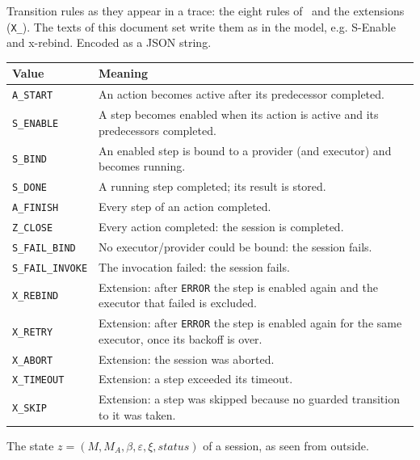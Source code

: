 \documentclass[a4paper]{arrowhead}
\begin{document}
Transition rules as they appear in a trace: the eight rules of~\cite{varga2026} and the extensions (\texttt{X\_}). The texts of this document set write them as in the model, e.g. S-Enable and x-rebind.
 Encoded as a JSON string.
{\small
\begin{longtable}{|p{3.9cm}|p{11.9cm}|}

\hline
\rowcolor{gray!33} Value & Meaning \\ \hline
\endhead
\texttt{A\_START} & An action becomes active after its predecessor completed. \\ \hline
\texttt{S\_ENABLE} & A step becomes enabled when its action is active and its predecessors completed. \\ \hline
\texttt{S\_BIND} & An enabled step is bound to a provider (and executor) and becomes running. \\ \hline
\texttt{S\_DONE} & A running step completed; its result is stored. \\ \hline
\texttt{A\_FINISH} & Every step of an action completed. \\ \hline
\texttt{Z\_CLOSE} & Every action completed: the session is completed. \\ \hline
\texttt{S\_FAIL\_BIND} & No executor/provider could be bound: the session fails. \\ \hline
\texttt{S\_\allowbreak{}FAIL\_\allowbreak{}INVOKE} & The invocation failed: the session fails. \\ \hline
\texttt{X\_REBIND} & Extension: after \texttt{ERROR} the step is enabled again and the executor that failed is excluded. \\ \hline
\texttt{X\_RETRY} & Extension: after \texttt{ERROR} the step is enabled again for the same executor, once its backoff is over. \\ \hline
\texttt{X\_ABORT} & Extension: the session was aborted. \\ \hline
\texttt{X\_TIMEOUT} & Extension: a step exceeded its timeout. \\ \hline
\texttt{X\_SKIP} & Extension: a step was skipped because no guarded transition to it was taken. \\ \hline
\end{longtable}
}

The state $z = (M, M_A, \beta, \varepsilon, \xi, status)$ of a session, as seen from outside.
\end{document}
